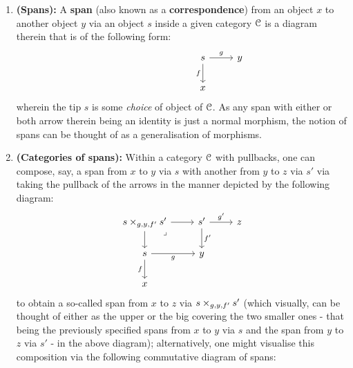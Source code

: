                 \begin{definition}[Spans] \label{def: spans} 
                    \noindent
                    \begin{enumerate}
                        \item \textbf{(Spans):} A \textbf{span} (also known as a \textbf{correspondence}) from an object $x$ to another object $y$ via an object $s$ inside a given category $\mathcal{C}$ is a diagram therein that is of the following form:
                            $$
                                \begin{tikzcd}
                                	&&& s & y \\
                                	{} &&& x
                                	\arrow["f"', from=1-4, to=2-4]
                                	\arrow["g", from=1-4, to=1-5]
                                \end{tikzcd}
                            $$
                        wherein the tip $s$ is some \textit{choice} of object of $\mathcal{C}$. As any span with either or both arrow therein being an identity is just a normal morphism, the notion of spans can be thought of as a generalisation of morphisms.  
                        \item \textbf{(Categories of spans):} Within a category $\mathcal{C}$ with pullbacks, one can compose, say, a span from $x$ to $y$ via $s$ with another from $y$ to $z$ via $s'$ via taking the pullback of the  arrows in the manner depicted by the following diagram:
                            $$
                                \begin{tikzcd}
                                	{s \x_{g, y, f'} s'} & {s'} & z \\
                                	s & y \\
                                	x
                                	\arrow["f"', from=2-1, to=3-1]
                                	\arrow["g"', from=2-1, to=2-2]
                                	\arrow["{f'}", from=1-2, to=2-2]
                                	\arrow["{g'}", from=1-2, to=1-3]
                                	\arrow[from=1-1, to=2-1]
                                	\arrow[from=1-1, to=1-2]
                                	\arrow["\lrcorner"{anchor=center, pos=0.125}, draw=none, from=1-1, to=2-2]
                                \end{tikzcd}
                            $$
                        to obtain a so-called  span from $x$ to $z$ via $s \x_{g, y, f'} s'$ (which visually, can be thought of either as the upper  or the big  covering the two smaller ones - that being the previously specified spans from $x$ to $y$ via $s$ and the span from $y$ to $z$ via $s'$ - in the above diagram); alternatively, one might visualise this composition via the following commutative diagram of spans:

\end{enumerate}
\end{definition}
